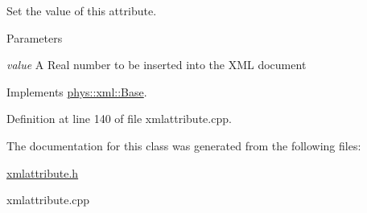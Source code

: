 Set the value of this attribute. 


\begin{DoxyParams}{Parameters}
\item[{\em value}]A Real number to be inserted into the XML document \end{DoxyParams}


Implements \hyperlink{classphys_1_1xml_1_1Base_ab3b63010428e7ffec34d35ba38017b0c}{phys::xml::Base}.



Definition at line 140 of file xmlattribute.cpp.



The documentation for this class was generated from the following files:\begin{DoxyCompactItemize}
\item 
\hyperlink{xmlattribute_8h}{xmlattribute.h}\item 
xmlattribute.cpp\end{DoxyCompactItemize}
